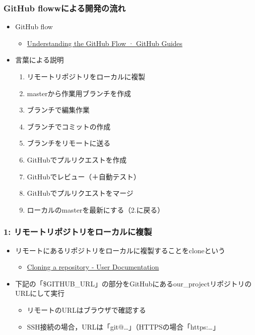 \documentclass[a4paper,twoside,twocolumn]{bxjsarticle}
\begin{document}
\subsubsection{GitHub flowwによる開発の流れ}
\label{sec-2-3-1}
\begin{itemize}
\item GitHub flow
\begin{itemize}
\item \href{https://guides.github.com/introduction/flow/}{Understanding the GitHub Flow · GitHub Guides}
\end{itemize}
\item 言葉による説明
\begin{enumerate}
\item リモートリポジトリをローカルに複製
\item masterから作業用ブランチを作成
\item ブランチで編集作業
\item ブランチでコミットの作成
\item ブランチをリモートに送る
\item GitHubでプルリクエストを作成
\item GitHubでレビュー（＋自動テスト）
\item GitHubでプルリクエストをマージ
\item ローカルのmasterを最新にする（2.に戻る）
\end{enumerate}
\end{itemize}

\subsubsection{1: リモートリポジトリをローカルに複製}
\label{sec-2-3-2}
\begin{itemize}
\item リモートにあるリポジトリをローカルに複製することをcloneという
\begin{itemize}
\item \href{https://help.github.com/articles/cloning-a-repository/}{Cloning a repository - User Documentation}
\end{itemize}
\item 下記の「\$GITHUB\_URL」の部分をGitHubにあるour\_projectリポジトリのURLにして実行
\begin{itemize}
\item リモートのURLはブラウザで確認する
\item SSH接続の場合，URLは「git@\ldots{}」（HTTPSの場合「https:\ldots{}」
\end{itemize}
\end{itemize}
\end{document}
